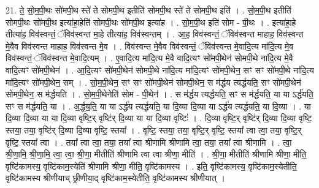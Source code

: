 \documentclass[17pt]{extarticle}
\begin{document}
21. ते॒ सो॒म॒पी॒थः सो॑मपी॒थ स्ते॑ ते सोमपी॒थ इतीति॑ सोमपी॒थ स्ते॑ ते सोमपी॒थ इति॑ । . सो॒म॒पी॒थ इतीति॑ सोमपी॒थः सो॑मपी॒थ इत्या॑हा॒हेति॑ सोमपी॒थः सो॑मपी॒थ इत्या॑ह । . सो॒म॒पी॒थ इति॑ सोम - पी॒थः । . इत्या॑हा॒हे तीत्या॑ह॒ विव॑स्वन्तं॒ ॅविव॑स्वन्त मा॒हे तीत्या॑ह॒ विव॑स्वन्तम् । . आ॒ह॒ विव॑स्वन्तं॒ ॅविव॑स्वन्त माहाह॒ विव॑स्वन्त मे॒वैव विव॑स्वन्त माहाह॒ विव॑स्वन्त मे॒व । . विव॑स्वन्त मे॒वैव विव॑स्वन्तं॒ ॅविव॑स्वन्त मे॒वादि॒त्य मा॑दि॒त्य मे॒व विव॑स्वन्तं॒ ॅविव॑स्वन्त मे॒वादि॒त्यम् । . ए॒वादि॒त्य मा॑दि॒त्य मे॒वै वादि॒त्यꣳ सो॑मपी॒थेन॑ सोमपी॒थे ना॑दि॒त्य मे॒वै वादि॒त्यꣳ सो॑मपी॒थेन॑ । . आ॒दि॒त्यꣳ सो॑मपी॒थेन॑ सोमपी॒थे ना॑दि॒त्य मा॑दि॒त्यꣳ सो॑मपी॒थेन॒ सꣳ सꣳ सो॑मपी॒थे ना॑दि॒त्य मा॑दि॒त्यꣳ सो॑मपी॒थेन॒ सम् । . सो॒म॒पी॒थेन॒ सꣳ सꣳ सो॑मपी॒थेन॑ सोमपी॒थेन॒ स म॑र्द्धय त्यर्द्धयति॒ सꣳ सो॑मपी॒थेन॑ सोमपी॒थेन॒ स म॑र्द्धयति । . सो॒म॒पी॒थेनेति॑ सोम - पी॒थेन॑ । . स म॑र्द्धय त्यर्द्धयति॒ सꣳ स म॑र्द्धयति॒ या या ऽर्द्ध॑यति॒ सꣳ स म॑र्द्धयति॒ या । . अ॒र्द्ध॒य॒ति॒ या या ऽर्द्ध॑य त्यर्द्धयति॒ या दि॒व्या दि॒व्या या ऽर्द्ध॑य त्यर्द्धयति॒ या दि॒व्या । . या दि॒व्या दि॒व्या या या दि॒व्या वृष्टि॒र् वृष्टि॑र् दि॒व्या या या दि॒व्या वृष्टिः॑ । . दि॒व्या वृष्टि॒र् वृष्टि॑र् दि॒व्या दि॒व्या वृष्टि॒ स्तया॒ तया॒ वृष्टि॑र् दि॒व्या दि॒व्या वृष्टि॒ स्तया᳚ । . वृष्टि॒ स्तया॒ तया॒ वृष्टि॒र् वृष्टि॒ स्तया᳚ त्वा त्वा॒ तया॒ वृष्टि॒र् वृष्टि॒ स्तया᳚ त्वा । . तया᳚ त्वा त्वा॒ तया॒ तया᳚ त्वा श्रीणामि श्रीणामि त्वा॒ तया॒ तया᳚ त्वा श्रीणामि । . त्वा॒ श्री॒णा॒मि॒ श्री॒णा॒मि॒ त्वा॒ त्वा॒ श्री॒णा॒ मीतीति॑ श्रीणामि त्वा त्वा श्रीणा॒ मीति॑ । . श्री॒णा॒ मीतीति॑ श्रीणामि श्रीणा॒ मीति॒ वृष्टि॑कामस्य॒ वृष्टि॑काम॒स्येति॑ श्रीणामि श्रीणा॒ मीति॒ वृष्टि॑कामस्य । . इति॒ वृष्टि॑कामस्य॒ वृष्टि॑काम॒स्येतीति॒ वृष्टि॑कामस्य श्रीणीयाच् छ्रीणीया॒द् वृष्टि॑काम॒स्येतीति॒ वृष्टि॑कामस्य श्रीणीयात् । \newline
\end{document}
